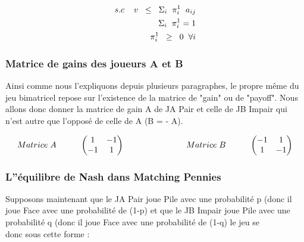 \documentclass[a4paper, 12pt, twoside]{article}
\begin{document}
{{\begin{align*}
\large{ s.c \hspace{0.4 cm} v \hspace{0,2 cm} \leq  \hspace{0.2 cm}\Sigma_{i}\hspace{0.2 cm} \pi_{i}^{1}\hspace{0.2 cm} a _{ij}} \\
\large{\Sigma_{i} \hspace{0.2 cm} \pi_{i}^{1} = 1} \\ 
\large{ \pi_{i}^{1} \hspace{0,2 cm} \geq \hspace{0,2 cm} 0 \hspace{0,2 cm} \forall i }
\end{align*}




\subsubsection{Matrice de gains des joueurs A et B}{Ainsi comme nous l'expliquons depuis plusieurs paragraphes, le propre même du jeu bimatricel repose sur l'existence de la matrice de "gain" ou de "payoff".  Nous allons donc donner la matrice de gain A de JA \textsf{Pair} et celle de JB \textsf{Impair} qui n'est autre que l'opposé de celle de  A (B = - A).}

\[
Matrice\hspace{0,1cm} A\hspace{1cm}
\begin{pmatrix}1&-1\\
-1&1\\
\end{pmatrix}\                      \hspace{2,5cm}  
Matrice\hspace{0,1cm} B \hspace{1cm}  
\begin{pmatrix}-1&1\\
1&-1\\
\end{pmatrix} 
\]

 

\subsubsection{L''équilibre de Nash dans Matching Pennies}{Supposons maintenant que le JA \textsf{Pair} joue \textsf{Pile} avec une probabilité \textsf{p} (donc il joue \textsf{Face} avec une probabilité de \textsf{(1-p)} et que le JB \textsf{Impair} joue \textsf{Pile} avec une probabilité \textsf{q} (donc il joue \textsf{Face} avec une probabilité de \textsf{(1-q)} le jeu se \\
 donc sous cette forme : } 

}}
\end{document}

